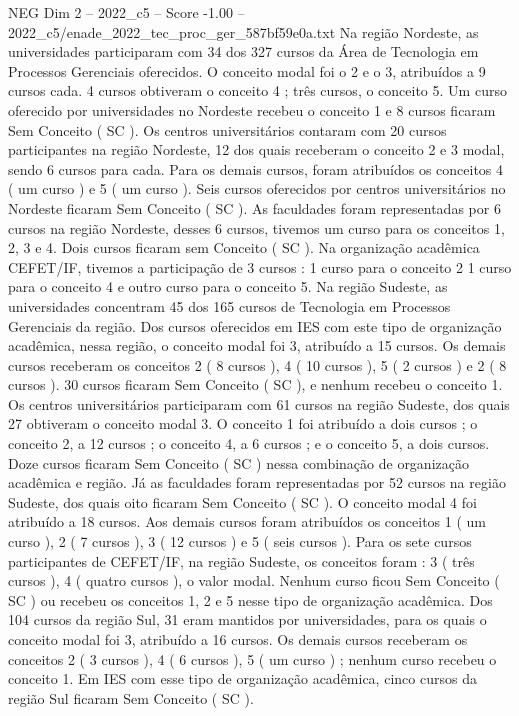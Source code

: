 \begin{textsample}{NEG Dim 2 – 2022\_c5 – Score -1.00 – 2022\_c5/enade\_2022\_tec\_proc\_ger\_587bf59e0a.txt}
Na região Nordeste, as universidades participaram com 34 dos 327 cursos da Área de Tecnologia em Processos Gerenciais oferecidos.
O conceito modal foi o 2 e o 3, atribuídos a 9 cursos cada. 4 cursos obtiveram o conceito 4 ; três cursos, o conceito 5.
Um curso oferecido por universidades no Nordeste recebeu o conceito 1 e 8 cursos ficaram Sem Conceito ( SC ).
Os centros universitários contaram com 20 cursos participantes na região Nordeste, 12 dos quais receberam o conceito 2 e 3 modal, sendo 6 cursos para cada.
Para os demais cursos, foram atribuídos os conceitos 4 ( um curso ) e 5 ( um curso ).
Seis cursos oferecidos por centros universitários no Nordeste ficaram Sem Conceito ( SC ).
As faculdades foram representadas por 6 cursos na região Nordeste, desses 6 cursos, tivemos um curso para os conceitos 1, 2, 3 e 4.
Dois cursos ficaram sem Conceito ( SC ).
Na organização acadêmica CEFET/IF, tivemos a participação de 3 cursos : 1 curso para o conceito 2 1 curso para o conceito 4 e outro curso para o conceito 5.
Na região Sudeste, as universidades concentram 45 dos 165 cursos de Tecnologia em Processos Gerenciais da região.
Dos cursos oferecidos em IES com este tipo de organização acadêmica, nessa região, o conceito modal foi 3, atribuído a 15 cursos.
Os demais cursos receberam os conceitos 2 ( 8 cursos ), 4 ( 10 cursos ), 5 ( 2 cursos ) e 2 ( 8 cursos ). 30 cursos ficaram Sem Conceito ( SC ), e nenhum recebeu o conceito 1.
Os centros universitários participaram com 61 cursos na região Sudeste, dos quais 27 obtiveram o conceito modal 3.
O conceito 1 foi atribuído a dois cursos ; o conceito 2, a 12 cursos ; o conceito 4, a 6 cursos ; e o conceito 5, a dois cursos.
Doze cursos ficaram Sem Conceito ( SC ) nessa combinação de organização acadêmica e região.
Já as faculdades foram representadas por 52 cursos na região Sudeste, dos quais oito ficaram Sem Conceito ( SC ).
O conceito modal 4 foi atribuído a 18 cursos.
Aos demais cursos foram atribuídos os conceitos 1 ( um curso ), 2 ( 7 cursos ), 3 ( 12 cursos ) e 5 ( seis cursos ).
Para os sete cursos participantes de CEFET/IF, na região Sudeste, os conceitos foram : 3 ( três cursos ), 4 ( quatro cursos ), o valor modal.
Nenhum curso ficou Sem Conceito ( SC ) ou recebeu os conceitos 1, 2 e 5 nesse tipo de organização acadêmica.
Dos 104 cursos da região Sul, 31 eram mantidos por universidades, para os quais o conceito modal foi 3, atribuído a 16 cursos.
Os demais cursos receberam os conceitos 2 ( 3 cursos ), 4 ( 6 cursos ), 5 ( um curso ) ; nenhum curso recebeu o conceito 1.
Em IES com esse tipo de organização acadêmica, cinco cursos da região Sul ficaram Sem Conceito ( SC ).

\end{textsample}
